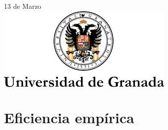 \begin{titlepage}

{\large 13 de Marzo}\\[2cm] %


\includegraphics{logo.png}\\[1cm] %
 

\vfill %

\end{titlepage}



%




\section{Eficiencia empírica}

